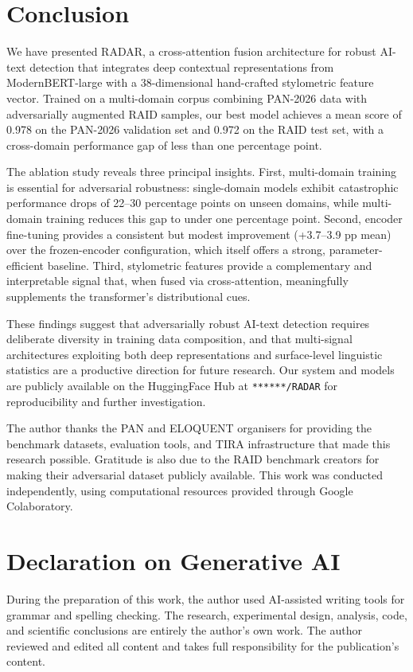 \documentclass[]{ceurart}
\begin{document}
\section{Conclusion}

We have presented RADAR, a cross-attention fusion architecture for robust AI-text detection that integrates deep contextual representations from ModernBERT-large with a 38-dimensional hand-crafted stylometric feature vector. Trained on a multi-domain corpus combining PAN-2026 data with adversarially augmented RAID samples, our best model achieves a mean score of 0.978 on the PAN-2026 validation set and 0.972 on the RAID test set, with a cross-domain performance gap of less than one percentage point.

The ablation study reveals three principal insights. First, multi-domain training is essential for adversarial robustness: single-domain models exhibit catastrophic performance drops of 22--30 percentage points on unseen domains, while multi-domain training reduces this gap to under one percentage point. Second, encoder fine-tuning provides a consistent but modest improvement (+3.7--3.9 pp mean) over the frozen-encoder configuration, which itself offers a strong, parameter-efficient baseline. Third, stylometric features provide a complementary and interpretable signal that, when fused via cross-attention, meaningfully supplements the transformer's distributional cues.

These findings suggest that adversarially robust AI-text detection requires deliberate diversity in training data composition, and that multi-signal architectures exploiting both deep representations and surface-level linguistic statistics are a productive direction for future research. Our system and models are publicly available on the HuggingFace Hub at \texttt{******/RADAR} for reproducibility and further investigation.

\begin{acknowledgments}
  The author thanks the PAN and ELOQUENT organisers for providing the benchmark datasets, evaluation tools, and TIRA infrastructure that made this research possible. Gratitude is also due to the RAID benchmark creators for making their adversarial dataset publicly available. This work was conducted independently, using computational resources provided through Google Colaboratory.
\end{acknowledgments}

\section*{Declaration on Generative AI}
During the preparation of this work, the author used AI-assisted writing tools for grammar and spelling checking. The research, experimental design, analysis, code, and scientific conclusions are entirely the author's own work. The author reviewed and edited all content and takes full responsibility for the publication's content.


\end{document}
